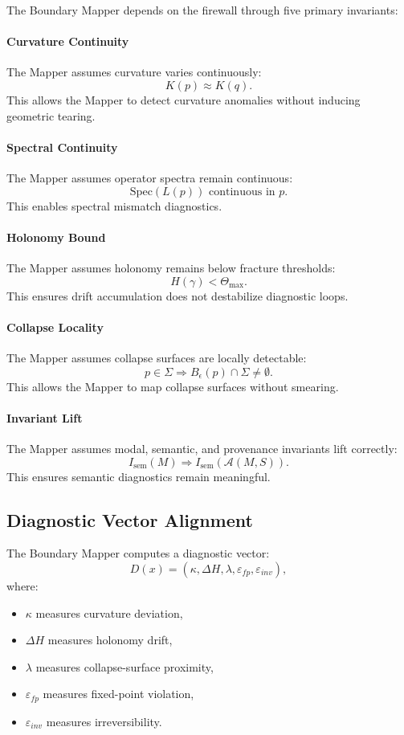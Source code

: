 The Boundary Mapper depends on the firewall through five primary invariants:

\paragraph{Curvature Continuity}
The Mapper assumes curvature varies continuously:
\[
K(p) \approx K(q).
\]
This allows the Mapper to detect curvature anomalies without inducing
geometric tearing.

\paragraph{Spectral Continuity}
The Mapper assumes operator spectra remain continuous:
\[
\mathrm{Spec}(L(p)) \text{ continuous in } p.
\]
This enables spectral mismatch diagnostics.

\paragraph{Holonomy Bound}
The Mapper assumes holonomy remains below fracture thresholds:
\[
H(\gamma) < \Theta_{\max}.
\]
This ensures drift accumulation does not destabilize diagnostic loops.

\paragraph{Collapse Locality}
The Mapper assumes collapse surfaces are locally detectable:
\[
p \in \Sigma \Rightarrow B_\epsilon(p) \cap \Sigma \neq \emptyset.
\]
This allows the Mapper to map collapse surfaces without smearing.

\paragraph{Invariant Lift}
The Mapper assumes modal, semantic, and provenance invariants lift correctly:
\[
I_{\mathrm{sem}}(M) \Rightarrow I_{\mathrm{sem}}(\mathcal{A}(M,S)).
\]
This ensures semantic diagnostics remain meaningful.

\subsection{Diagnostic Vector Alignment}

The Boundary Mapper computes a diagnostic vector:
\[
D(x) = (\kappa, \Delta H, \lambda, \varepsilon_{fp}, \varepsilon_{inv}),
\]
where:

\begin{itemize}
    \item $\kappa$ measures curvature deviation,
    \item $\Delta H$ measures holonomy drift,
    \item $\lambda$ measures collapse-surface proximity,
    \item $\varepsilon_{fp}$ measures fixed-point violation,
    \item $\varepsilon_{inv}$ measures irreversibility.
\end{itemize}

